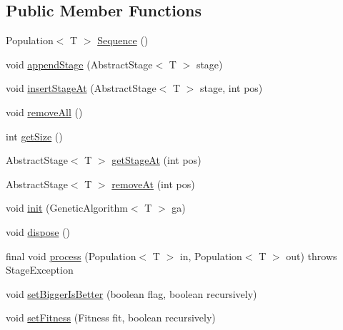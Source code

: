 \subsection*{Public Member Functions}
\begin{DoxyCompactItemize}
\item 
Population$<$ T $>$ \hyperlink{classjenes_1_1stage_1_1_sequence_3_01_t_01extends_01_chromosome_01_4_a8d41af628fe9c1e2fdf4be3c9938a172}{Sequence} ()
\item 
void \hyperlink{classjenes_1_1stage_1_1_sequence_3_01_t_01extends_01_chromosome_01_4_a7d0e59aeed366cb6f71f754f61bfceb3}{append\-Stage} (Abstract\-Stage$<$ T $>$ stage)
\item 
void \hyperlink{classjenes_1_1stage_1_1_sequence_3_01_t_01extends_01_chromosome_01_4_a922e6363fc19620738e95ddfc649ea6e}{insert\-Stage\-At} (Abstract\-Stage$<$ T $>$ stage, int pos)
\item 
void \hyperlink{classjenes_1_1stage_1_1_sequence_3_01_t_01extends_01_chromosome_01_4_ab020311ac8fad8d6d884df9634c211b8}{remove\-All} ()
\item 
int \hyperlink{classjenes_1_1stage_1_1_sequence_3_01_t_01extends_01_chromosome_01_4_af16f419e9be758779fa14cf53f31bfe1}{get\-Size} ()
\item 
Abstract\-Stage$<$ T $>$ \hyperlink{classjenes_1_1stage_1_1_sequence_3_01_t_01extends_01_chromosome_01_4_aa9e1d97737fed4c5141cda315c216b32}{get\-Stage\-At} (int pos)
\item 
Abstract\-Stage$<$ T $>$ \hyperlink{classjenes_1_1stage_1_1_sequence_3_01_t_01extends_01_chromosome_01_4_a1336b162d37aaa9b402c49480d12f8ef}{remove\-At} (int pos)
\item 
void \hyperlink{classjenes_1_1stage_1_1_sequence_3_01_t_01extends_01_chromosome_01_4_a98d9ad6e0fdc1547971fe7fce029e25f}{init} (Genetic\-Algorithm$<$ T $>$ ga)
\item 
void \hyperlink{classjenes_1_1stage_1_1_sequence_3_01_t_01extends_01_chromosome_01_4_a4faf3479fa76eef530633ce8339971e5}{dispose} ()
\item 
final void \hyperlink{classjenes_1_1stage_1_1_sequence_3_01_t_01extends_01_chromosome_01_4_adc0e7397edd44839ef221122db3696e8}{process} (Population$<$ T $>$ in, Population$<$ T $>$ out)  throws Stage\-Exception 
\item 
void \hyperlink{classjenes_1_1stage_1_1_sequence_3_01_t_01extends_01_chromosome_01_4_a759a03c3336352cc390b2024afcc2ab1}{set\-Bigger\-Is\-Better} (boolean flag, boolean recursively)
\item 
void \hyperlink{classjenes_1_1stage_1_1_sequence_3_01_t_01extends_01_chromosome_01_4_a1ec43e74c2534861caf2475405869853}{set\-Fitness} (Fitness fit, boolean recursively)
\end{DoxyCompactItemize}
